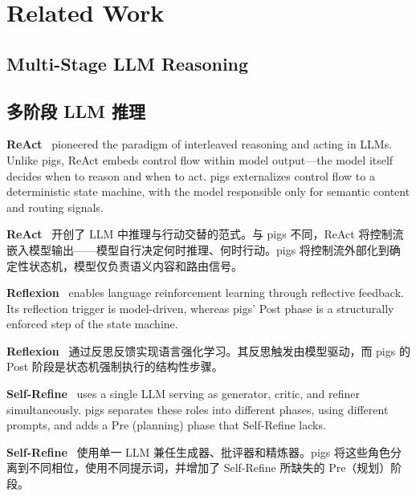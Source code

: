 \section{Related Work}
\label{sec:related}

\subsection{Multi-Stage LLM Reasoning}
\begin{chinese}
\subsection*{多阶段 LLM 推理}
\end{chinese}

\textbf{ReAct}~\citep{yao2022react} pioneered the paradigm of interleaved reasoning and acting in LLMs. Unlike pigs, ReAct embeds control flow within model output---the model itself decides when to reason and when to act. pigs externalizes control flow to a deterministic state machine, with the model responsible only for semantic content and routing signals.
\begin{chinese}
\textbf{ReAct}~\citep{yao2022react} 开创了 LLM 中推理与行动交替的范式。与 pigs 不同，ReAct 将控制流嵌入模型输出——模型自行决定何时推理、何时行动。pigs 将控制流外部化到确定性状态机，模型仅负责语义内容和路由信号。
\end{chinese}

\textbf{Reflexion}~\citep{shinn2023reflexion} enables language reinforcement learning through reflective feedback. Its reflection trigger is model-driven, whereas pigs' Post phase is a structurally enforced step of the state machine.
\begin{chinese}
\textbf{Reflexion}~\citep{shinn2023reflexion} 通过反思反馈实现语言强化学习。其反思触发由模型驱动，而 pigs 的 Post 阶段是状态机强制执行的结构性步骤。
\end{chinese}

\textbf{Self-Refine}~\citep{madaan2023selfrefine} uses a single LLM serving as generator, critic, and refiner simultaneously. pigs separates these roles into different phases, using different prompts, and adds a Pre (planning) phase that Self-Refine lacks.
\begin{chinese}
\textbf{Self-Refine}~\citep{madaan2023selfrefine} 使用单一 LLM 兼任生成器、批评器和精炼器。pigs 将这些角色分离到不同相位，使用不同提示词，并增加了 Self-Refine 所缺失的 Pre（规划）阶段。
\end{chinese}

